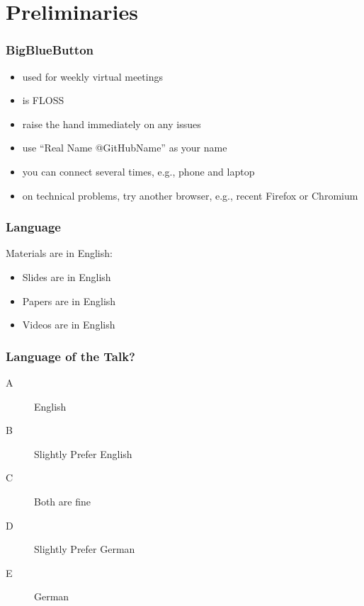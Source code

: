 

\title{\mylecture}



\section{Preliminaries}

\begin{frame}
	\frametitle{BigBlueButton}
	\begin{itemize}
		\item used for weekly virtual meetings
		\item is FLOSS
		\item raise the hand immediately on any issues
		\item use ``Real Name @GitHubName'' as your name
		\item you can connect several times, e.g., phone and laptop
		\item on technical problems, try another browser, e.g., recent Firefox or Chromium
	\end{itemize}
\end{frame}

\begin{frame}
	\frametitle{Language}
	Materials are in English:
	\begin{itemize}
		\item Slides are in English
		\item Papers are in English
		\item Videos are in English
	\end{itemize}
\end{frame}

\begin{assignment}
	\frametitle{Language of the Talk?}
	\begin{task}
	\begin{description}
	\item[A] English
	\item[B] Slightly Prefer English
	\item[C] Both are fine
	\item[D] Slightly Prefer German
	\item[E] German
	\end{description}
	\end{task}
\end{assignment}

